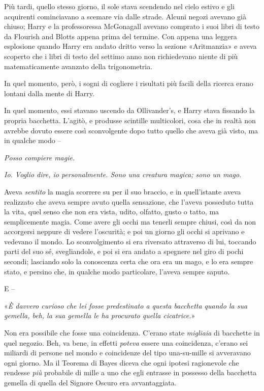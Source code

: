 Più tardi, quello stesso giorno, il sole stava scendendo nel cielo estivo e gli acquirenti cominciavano a scemare via dalle strade. Alcuni negozi avevano già chiuso; Harry e la professoressa McGonagall avevano comprato i suoi libri di testo da Flourish and Blotts appena prima del termine. Con appena una leggera esplosione quando Harry era andato dritto verso la sezione «Aritmanzia» e aveva scoperto che i libri di testo del settimo anno non richiedevano niente di più matematicamente avanzato della trigonometria.

In quel momento, però, i sogni di cogliere i risultati più facili della ricerca erano lontani dalla mente di Harry.

In quel momento, essi stavano uscendo da Ollivander’s, e Harry stava fissando la propria bacchetta. L’agitò, e produsse scintille multicolori, cosa che in realtà non avrebbe dovuto essere così sconvolgente dopo tutto quello che aveva già visto, ma in qualche modo –

\textit{Posso compiere magie.}

\textit{Io. Voglio dire, io personalmente. Sono una creatura magica; sono un mago.}

Aveva \textit{sentito} la magia scorrere su per il suo braccio, e in quell’istante aveva realizzato che aveva sempre avuto quella sensazione, che l’aveva posseduto tutta la vita, quel senso che non era vista, udito, olfatto, gusto o tatto, ma semplicemente magia. Come avere gli occhi ma tenerli sempre chiusi, così da non accorgersi neppure di vedere l’oscurità; e poi un giorno gli occhi si aprivano e vedevano il mondo. Lo sconvolgimento si era riversato attraverso di lui, toccando parti del suo sé, svegliandole, e poi si era andato a spegnere nel giro di pochi secondi; lasciando solo la conoscenza certa che ora era un mago, e lo era sempre stato, e persino che, in qualche modo particolare, l’aveva sempre saputo.

E –

«\textit{È davvero curioso che lei fosse predestinato a questa bacchetta quando la sua gemella, beh, la sua gemella le ha procurato quella cicatrice.}»

Non era possibile che fosse una coincidenza. C’erano state \textit{migliaia} di bacchette in quel negozio. Beh, va bene, in effetti \textit{poteva} essere una coincidenza, c’erano sei miliardi di persone nel mondo e coincidenze del tipo una-su-mille si avveravano ogni giorno. Ma il Teorema di Bayes diceva che ogni ipotesi ragionevole che rendesse \textit{più} probabile di mille a uno che egli entrasse in possesso della bacchetta gemella di quella del Signore Oscuro era avvantaggiata.

